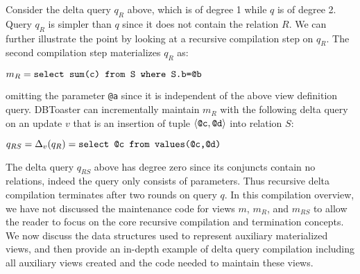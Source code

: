 Consider the delta query $q_R$ above, which is of degree 1 while $q$ is of
degree 2. Query $q_R$ is simpler than $q$ since it does not contain the relation
$R$. We can further illustrate the point by looking at a recursive compilation
step on $q_R$. The second compilation step materializes $q_R$ as:

\vspace{1mm}
$m_R = \mbox{{\tt select sum(c) from S where S.b=@b}}$

\vspace{1mm}
\noindent omitting the parameter {\tt @a} since it is independent of the above
view definition query. DBToaster can incrementally maintain $m_R$
with the following delta query on an update $v$ that is an insertion of tuple
${\langle\mbox{{\tt @c}},\mbox{{\tt @d}}\rangle}$ into relation $S$:

\vspace{1mm}
$q_{RS} = \Delta_v(q_R) = \mbox{\tt select @c from values(@c,@d)}$

\vspace{1mm}
\noindent The delta query $q_{RS}$ above has degree zero since its conjuncts
contain no relations, indeed the query only consists of parameters. Thus
recursive delta compilation terminates after two rounds on query $q$.
In this compilation overview, we have not discussed the maintenance code for
views $m$, $m_R$, and $m_{RS}$ to allow the reader to focus on the core recursive
compilation and termination concepts. We now discuss the data structures used to
represent auxiliary materialized views, and then provide an in-depth example of
delta query compilation including all auxiliary views created and the code
needed to maintain these views.


